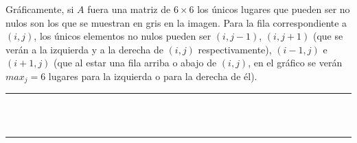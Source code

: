 \documentclass[a4paper]{article}
\begin{document}
Gráficamente, si $A$ fuera una matriz de $6 \times 6$ los únicos lugares que pueden
ser no nulos son los que se muestran en gris en la imagen. Para la fila 
correspondiente a $(i,j)$, los únicos elementos no nulos pueden ser $(i, j-1)$, 
$(i,j+1)$ (que se verán a la izquierda y a la derecha de $(i,j)$ respectivamente), 
$(i-1, j)$ e $(i+1,j)$ (que al estar una fila arriba o abajo de $(i,j)$, 
en el gráfico se verán $max_j = 6$ lugares para la izquierda o para la derecha de él). 

\begin{table}[!htbp]
\centering
\begin{tabular}{|l|l|l|l|l|l|l|l|l|l|l|l|l|l|l|l|l|l|l|l|l|l|l|l|l|l|l|l|l|l|l|l|l|l|l|l|}
\hline
 & & & & & & & & & & & & & & & & & & & & & & & & & & & & & & & & & & & \\ \hline 
 & & & & & & & & & & & & & & & & & & & & & & & & & & & & & & & & & & & \\ \hline 
 & & & & & & & & & & & & & & & & & & & & & & & & & & & & & & & & & & & \\ \hline 
 & & & & & & & & & & & & & & & & & & & & & & & & & & & & & & & & & & & \\ \hline 
 & & & & & & & & & & & & & & & & & & & & & & & & & & & & & & & & & & & \\ \hline 
 & & & & & & & & & & & & & & & & & & & & & & & & & & & & & & & & & & & \\ \hline 
 & & & & & & & & & & & & & & & & & & & & & & & & & & & & & & & & & & & \\ \hline 
 & \cellcolor{mygray} & & & & & \cellcolor{mygray} & \cellcolor{mygray} & \cellcolor{mygray} & & & & & \cellcolor{mygray} & & & & & & & & & & & & & & & & & & & & & & \\ \hline 
 & & \cellcolor{mygray} & & & & & \cellcolor{mygray} & \cellcolor{mygray} & \cellcolor{mygray} & & & & & \cellcolor{mygray} & & & & & & & & & & & & & & & & & & & & & \\ \hline 
 & & & \cellcolor{mygray} & & & & & \cellcolor{mygray} & \cellcolor{mygray} & \cellcolor{mygray} & & & & & \cellcolor{mygray} & & & & & & & & & & & & & & & & & & & & \\ \hline 
 & & & & \cellcolor{mygray} & & & & & \cellcolor{mygray} & \cellcolor{mygray} & \cellcolor{mygray} & & & & & \cellcolor{mygray} & & & & & & & & & & & & & & & & & & & \\ \hline 
 & & & & & & & & & & & & & & & & & & & & & & & & & & & & & & & & & & & \\ \hline 
 & & & & & & & & & & & & & & & & & & & & & & & & & & & & & & & & & & & \\ \hline 

\end{tabular}
\end{table}
\end{document}
